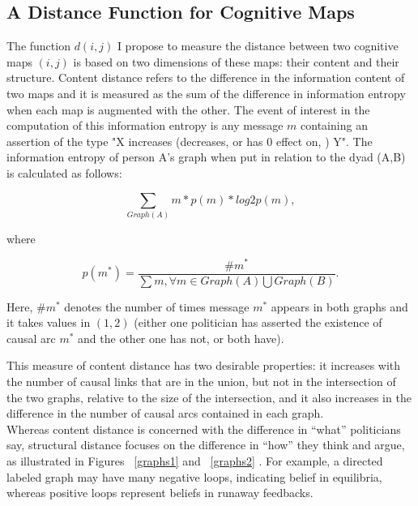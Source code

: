 \documentclass[12pt]{article}
\begin{document}
\subsection{A Distance Function for Cognitive Maps}

The function $d(i, j)$ I propose to measure the distance between two cognitive maps $(i,j)$ is based on two dimensions of these maps: their content and their structure. Content distance refers to the difference in the information content of two maps and it is measured as the sum of the difference in information entropy when each map is augmented with the other. The event of interest in the computation of this information entropy is any message $m$ containing an assertion of the type "X increases (decreases, or has 0 effect on, ) Y". The information entropy of person A's graph when put in relation to the dyad (A,B) is calculated as follows:

$$\sum_{Graph(A)} m*p(m) * log 2p(m),$$

where 

$$p(m^*)= \frac{\#m^*}{\sum m, \forall m \in Graph(A) \bigcup Graph(B)}.$$ 
 
Here, $\#m^*$ denotes the number of times message $m^*$ appears in both graphs and it takes values in $(1, 2)$ (either one politician has asserted the existence of causal arc $m^*$ and the other one has not, or both have).

This measure of content distance has two desirable properties: it increases with the number of causal links that are in the union, but not in the intersection of the two graphs, relative to the size of the intersection, and it also increases in the difference in the number of causal arcs contained in each graph. \\
Whereas content distance is concerned with the difference in ``what'' politicians say, structural distance focuses on the difference in ``how'' they think and argue, as illustrated in Figures ~\ref{graphs1} and ~\ref{graphs2} . For example, a directed labeled graph may have many negative loops, indicating belief in equilibria, whereas positive loops represent beliefs in runaway feedbacks.      
\end{document}
